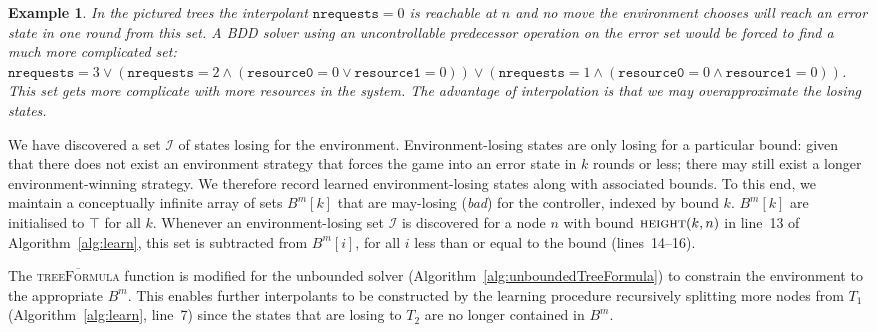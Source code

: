 \documentclass{llncs}
\newcommand{\textoverline}[1]{$\overline{\mbox{#1}}$}
\newtheorem*{exmp}{Example}
\begin{document}
\begin{exmp}

    In the pictured trees the interpolant $\texttt{nrequests} = 0$ is reachable
    at $n$ and no move the environment chooses will reach an error state in one
    round from this set. A BDD solver using an uncontrollable predecessor
    operation on the error set would be forced to find a much more complicated
    set: $\texttt{nrequests} = 3 \lor (\texttt{nrequests} = 2 \land (
    \texttt{resource0} = 0 \lor \texttt{resource1} = 0)) \lor
    (\texttt{nrequests} = 1 \land (\texttt{resource0} = 0 \land
    \texttt{resource1} = 0))$. This set gets more complicate with more
    resources in the system. The advantage of interpolation is that we may
    overapproximate the losing states.

\end{exmp}

We have discovered a set $\mathcal{I}$ of states losing for the environment.
Environment-losing states are only losing for a particular bound: given that
there does not exist an environment strategy that forces the game into an error
state in $k$ rounds or less; there may still exist a longer environment-winning
strategy.  We therefore record learned environment-losing states along with
associated bounds.  To this end, we maintain a conceptually infinite array of
sets $B^m[k]$ that are may-losing (\textit{bad}) for the controller, indexed by
bound $k$.  $B^m[k]$ are initialised to $\top$ for all $k$.  Whenever an
environment-losing set $\mathcal{I}$ is discovered for a node $n$ with bound
$\textsc{height}(k, n)$ in line~13 of Algorithm~\ref{alg:learn}, this set is
subtracted from $B^m[i]$, for all $i$ less than or equal to the bound
(lines~14--16).

The \textsc{\textoverline{treeFormula}} function is modified for the unbounded
solver (Algorithm~\ref{alg:unboundedTreeFormula}) to constrain the environment
to the appropriate $B^m$. This enables further interpolants to be constructed
by the learning procedure recursively splitting more nodes from $T_1$
(Algorithm~\ref{alg:learn}, line~7) since the states that are losing to $T_2$
are no longer contained in $B^m$.
\end{document}
